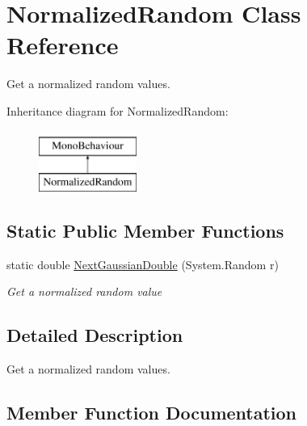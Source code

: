 \hypertarget{class_normalized_random}{}\section{Normalized\+Random Class Reference}
\label{class_normalized_random}


Get a normalized random values.  


Inheritance diagram for Normalized\+Random\+:\begin{figure}[H]
\begin{center}
\leavevmode
\includegraphics[height=2.000000cm]{class_normalized_random}
\end{center}
\end{figure}
\subsection*{Static Public Member Functions}
\begin{DoxyCompactItemize}
\item 
static double \mbox{\hyperlink{class_normalized_random_a56db02bf9c1613d2c57405cb61241866}{Next\+Gaussian\+Double}} (System.\+Random r)
\begin{DoxyCompactList}\small\item\em Get a normalized random value \end{DoxyCompactList}\end{DoxyCompactItemize}


\subsection{Detailed Description}
Get a normalized random values. 



\subsection{Member Function Documentation}
\mbox{\label{class_normalized_random_a56db02bf9c1613d2c57405cb61241866}} 
